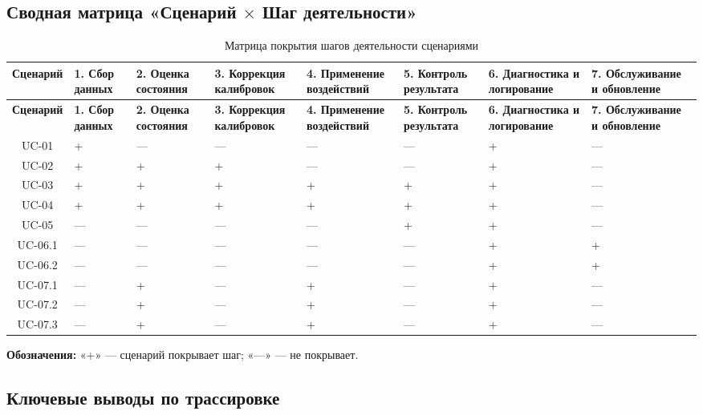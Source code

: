 \documentclass[14pt, a4paper]{extarticle}
\begin{document}
				\subsection{Сводная матрица «Сценарий \(\times\) Шаг деятельности»}
				
				{\fontsize{9}{11}\selectfont
					\begin{xltabular}{\textwidth}{|c|L|L|L|L|L|L|L|}
					\caption{Матрица покрытия шагов деятельности сценариями}\label{tab:coverage}\\
					\hline
					\textbf{Сценарий} & \textbf{1. Сбор данных} & \textbf{2. Оценка состояния} & \textbf{3. Коррекция калибровок} & \textbf{4. Применение воздействий} & \textbf{5. Контроль результата} & \textbf{6. Диагностика и логирование} & \textbf{7. Обслуживание и обновление} \\
					\hline
					\endfirsthead
					\hline
					\textbf{Сценарий} & \textbf{1. Сбор данных} & \textbf{2. Оценка состояния} & \textbf{3. Коррекция калибровок} & \textbf{4. Применение воздействий} & \textbf{5. Контроль результата} & \textbf{6. Диагностика и логирование} & \textbf{7. Обслуживание и обновление} \\
					\hline
					\endhead
					\hline
					\endfoot
					\hline
					\endlastfoot
					UC-01 & + & — & — & — & — & + & — \\
					\hline
					UC-02 & + & + & + & — & — & + & — \\
					\hline
					UC-03 & + & + & + & + & + & + & — \\
					\hline
					UC-04 & + & + & + & + & + & + & — \\
					\hline
					UC-05 & — & — & — & — & + & + & — \\
					\hline
					UC-06.1 & — & — & — & — & — & + & + \\
					\hline
					UC-06.2 & — & — & — & — & — & + & + \\
					\hline
					UC-07.1 & — & + & — & + & — & + & — \\
					\hline
					UC-07.2 & — & + & — & + & — & + & — \\
					\hline
					UC-07.3 & — & + & — & + & — & + & — \\
					\hline
				\end{xltabular}}
				
				\textbf{Обозначения:} «+» — сценарий покрывает шаг; «—» — не покрывает.
				
				\subsection{Ключевые выводы по трассировке}
				
\end{document}
